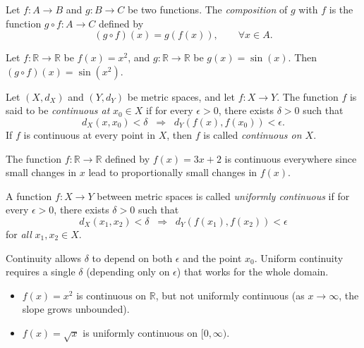 \begin{definition}
Let $f:A \to B$ and $g:B \to C$ be two functions.  
The \emph{composition} of $g$ with $f$ is the function $g \circ f : A \to C$ defined by
\[
(g \circ f)(x) = g(f(x)), \qquad \forall x \in A.
\]
\end{definition}

\begin{example}
Let $f:\mathbb{R}\to \mathbb{R}$ be $f(x)=x^2$, and $g:\mathbb{R}\to \mathbb{R}$ be $g(x)=\sin(x)$.  
Then $(g \circ f)(x) = \sin(x^2)$.  
\end{example}

\begin{definition}
Let $(X,d_X)$ and $(Y,d_Y)$ be metric spaces, and let $f:X \to Y$.  
The function $f$ is said to be \emph{continuous at} $x_0 \in X$ if for every $\epsilon > 0$, there exists $\delta > 0$ such that
\[
d_X(x,x_0) < \delta \;\;\Rightarrow\;\; d_Y(f(x), f(x_0)) < \epsilon.
\]
If $f$ is continuous at every point in $X$, then $f$ is called \emph{continuous on $X$}.  
\end{definition}

\begin{example}
The function $f:\mathbb{R}\to \mathbb{R}$ defined by $f(x) = 3x+2$ is continuous everywhere since small changes in $x$ lead to proportionally small changes in $f(x)$.  
\end{example}

\begin{definition}
A function $f:X \to Y$ between metric spaces is called \emph{uniformly continuous} if for every $\epsilon > 0$, there exists $\delta > 0$ such that
\[
d_X(x_1,x_2) < \delta \;\;\Rightarrow\;\; d_Y(f(x_1), f(x_2)) < \epsilon
\]
for \emph{all} $x_1, x_2 \in X$.  
\end{definition}

\begin{remark}
Continuity allows $\delta$ to depend on both $\epsilon$ and the point $x_0$.  
Uniform continuity requires a single $\delta$ (depending only on $\epsilon$) that works for the whole domain.  
\end{remark}

\begin{example}
\begin{itemize}
    \item $f(x) = x^2$ is continuous on $\mathbb{R}$, but not uniformly continuous (as $x \to \infty$, the slope grows unbounded).  
    \item $f(x) = \sqrt{x}$ is uniformly continuous on $[0,\infty)$.  
\end{itemize}
\end{example}

